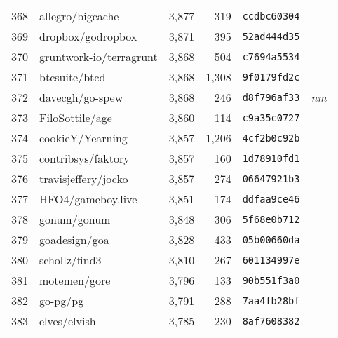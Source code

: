 {\begin{supertabular}{llrrll}
        368 &                   allegro/bigcache &  3,877 &    319 &  \texttt{ccdbc60304} &              \\
        369 &                  dropbox/godropbox &  3,871 &    395 &  \texttt{52ad444d35} &              \\
        370 &            gruntwork-io/terragrunt &  3,868 &    504 &  \texttt{c7694a5534} &              \\
        371 &                      btcsuite/btcd &  3,868 &  1,308 &  \texttt{9f0179fd2c} &              \\
        372 &                    davecgh/go-spew &  3,868 &    246 &  \texttt{d8f796af33} &  \textit{nm} \\
        373 &                    FiloSottile/age &  3,860 &    114 &  \texttt{c9a35c0727} &              \\
        374 &                   cookieY/Yearning &  3,857 &  1,206 &  \texttt{4cf2b0c92b} &              \\
        375 &                 contribsys/faktory &  3,857 &    160 &  \texttt{1d78910fd1} &              \\
        376 &                travisjeffery/jocko &  3,857 &    274 &  \texttt{06647921b3} &              \\
        377 &                  HFO4/gameboy.live &  3,851 &    174 &  \texttt{ddfaa9ce46} &              \\
        378 &                        gonum/gonum &  3,848 &    306 &  \texttt{5f68e0b712} &              \\
        379 &                      goadesign/goa &  3,828 &    433 &  \texttt{05b00660da} &              \\
        380 &                      schollz/find3 &  3,810 &    267 &  \texttt{601134997e} &              \\
        381 &                       motemen/gore &  3,796 &    133 &  \texttt{90b551f3a0} &              \\
        382 &                           go-pg/pg &  3,791 &    288 &  \texttt{7aa4fb28bf} &              \\
        383 &                       elves/elvish &  3,785 &    230 &  \texttt{8af7608382} &              \\

\end{supertabular}}
